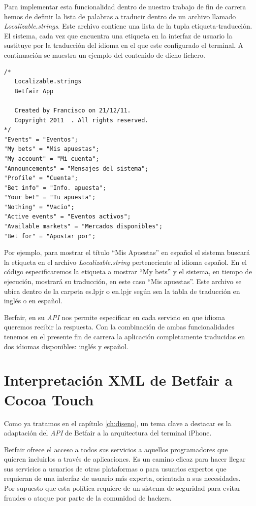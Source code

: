   
  
  Para implementar esta funcionalidad dentro de nuestro trabajo de fin de carrera hemos de definir la lista de palabras a traducir dentro de un archivo llamado \emph{Localizable.strings}.  Este archivo contiene una lista de la tupla etiqueta-traducción. El sistema, cada vez que encuentra una etiqueta en la interfaz de usuario la sustituye por la traducción del idioma en el que este configurado el terminal. A continuación se muestra un ejemplo del contenido de dicho fichero.
  
\begin{lstlisting}[frame=single, language=xml,basicstyle=\small, keywordstyle = \color{blue}]
/* 
   Localizable.strings
   Betfair App

   Created by Francisco on 21/12/11.
   Copyright 2011  . All rights reserved.
*/
"Events" = "Eventos";
"My bets" = "Mis apuestas";
"My account" = "Mi cuenta";
"Announcements" = "Mensajes del sistema";
"Profile" = "Cuenta";
"Bet info" = "Info. apuesta";
"Your bet" = "Tu apuesta";
"Nothing" = "Vacio";
"Active events" = "Eventos activos";
"Available markets" = "Mercados disponibles";
"Bet for" = "Apostar por";  
\end{lstlisting}

  
   Por ejemplo, para mostrar el título ``Mis Apuestas'' en español el sistema buscará la etiqueta en el archivo \emph{Localizable.string} perteneciente al idioma español. En el código especificaremos la etiqueta a mostrar ``My bets'' y el sistema, en tiempo de ejecución, mostrará su traducción, en este caso ``Mis apuestas''.  Este archivo se ubica dentro de la carpeta es.lpjr o en.lpjr según sea la tabla de traducción en inglés o en español. 
   
   Berfair, en su \emph{API} nos permite especificar en cada servicio en que idioma queremos recibir la respuesta. Con la combinación de ambas funcionalidades tenemos en el presente fin de carrera la aplicación completamente traducidas en dos idiomas disponibles: inglés y español. 
   
\section{Interpretación XML de Betfair a Cocoa Touch}
 Como ya tratamos en el capítulo \ref{ch:diseno}, un tema clave a destacar es la adaptación del \emph{API} de Betfair a la arquitectura del terminal iPhone. 
 
  Betfair ofrece el acceso a todos sus servicios a aquellos programadores que quieren incluirlos a través de aplicaciones. Es un camino eficaz para hacer llegar sus servicios a usuarios de otras plataformas o para usuarios expertos que requieran de una interfaz de usuario más experta, orientada a sus necesidades. Por supuesto que esta política requiere de un sistema de seguridad para evitar fraudes o ataque por parte de la comunidad de hackers.
   
